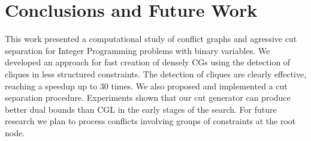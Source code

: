 \documentclass{endm}
\begin{document}
\section{Conclusions and Future Work}\label{conclusions}

This work presented a computational study of conflict graphs and agressive cut separation for Integer Programming problems with binary variables. We developed an approach for fast creation of densely CGs using the detection of cliques in less structured constraints. The detection of cliques are clearly effective, reaching a speedup up to 30 times. We also proposed and implemented a cut separation procedure. Experiments shown that our cut generator can produce better dual bounds than CGL in the early stages of the search. For future research we plan to process conflicts involving groups of constraints at the root node. 


\end{document}
